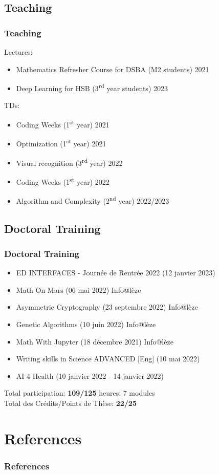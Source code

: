 \documentclass{beamer}
\begin{document}
	\subsection{Teaching}
	\begin{frame}
		\frametitle{Teaching}
		Lectures:
		\begin{itemize}
			\item Mathematics Refresher Course for DSBA (M2 students) 2021
			\item Deep Learning for HSB (3\textsuperscript{rd} year students) 2023
		\end{itemize}
		\vspace{0.5cm}
		TDs:
		\begin{itemize}
			\item Coding Weeks (1\textsuperscript{st} year) 2021
			\item Optimization (1\textsuperscript{st} year) 2021
			\item Visual recognition (3\textsuperscript{rd} year) 2022
			\item Coding Weeks (1\textsuperscript{st} year) 2022
			\item Algorithm and Complexity (2\textsuperscript{nd} year) 2022/2023
		\end{itemize}
	\end{frame}
	
	\subsection{Doctoral Training}
	\begin{frame}
		\frametitle{Doctoral Training}
		\begin{itemize}
			\item ED INTERFACES - Journée de Rentrée 2022 (12 janvier 2023)
			\item Math On Mars (06 mai 2022) Info@lèze
			\item Asymmetric Cryptography (23 septembre 2022) Info@lèze
			\item Genetic Algorithms (10 juin 2022) Info@lèze
			\item Math With Jupyter (18 décembre 2021) Info@lèze
			\item Writing skills in Science ADVANCED [Eng] (10 mai 2022)
			\item AI 4 Health (10 janvier 2022 - 14 janvier 2022)
		\end{itemize}
		\vspace{0.5cm}
		Total participation: \textbf{109/125} heures; 7 modules\\
		Total des Crédits/Points de Thèse: \textbf{22/25}
	\end{frame}
	
	\section{References}
	\begin{frame}[allowframebreaks]
		\frametitle{References}
		\nocite{*}
		
		
	\end{frame}
\end{document}
